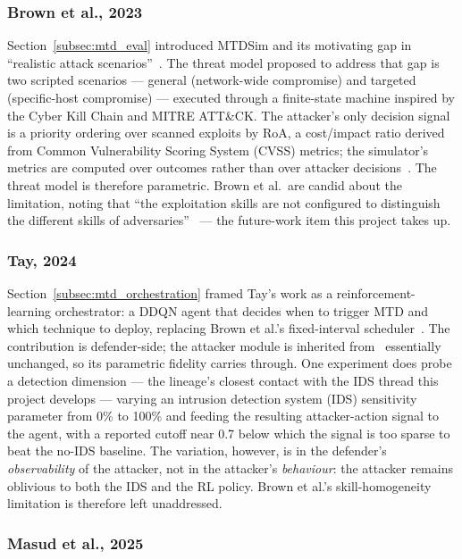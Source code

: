 \subsubsection{Brown et al., 2023}

Section~\ref{subsec:mtd_eval} introduced MTDSim and its motivating gap in ``realistic attack scenarios''~\cite[p.~1]{brown2023}. The threat model proposed to address that gap is two scripted scenarios --- general (network-wide compromise) and targeted (specific-host compromise) --- executed through a finite-state machine inspired by the Cyber Kill Chain and MITRE ATT\&CK. The attacker's only decision signal is a priority ordering over scanned exploits by RoA, a cost/impact ratio derived from Common Vulnerability Scoring System (CVSS) metrics; the simulator's metrics are computed over outcomes rather than over attacker decisions~\cite{brown2023}. The threat model is therefore parametric. Brown et al.\ are candid about the limitation, noting that ``the exploitation skills are not configured to distinguish the different skills of adversaries''~\cite[p.~7]{brown2023} --- the future-work item this project takes up.

\subsubsection{Tay, 2024}

Section~\ref{subsec:mtd_orchestration} framed Tay's work as a reinforcement-learning orchestrator: a DDQN agent that decides when to trigger MTD and which technique to deploy, replacing Brown et al.'s fixed-interval scheduler~\cite{tay2024}. The contribution is defender-side; the attacker module is inherited from~\cite{brown2023} essentially unchanged, so its parametric fidelity carries through. One experiment does probe a detection dimension --- the lineage's closest contact with the IDS thread this project develops --- varying an intrusion detection system (IDS) sensitivity parameter from 0\% to 100\% and feeding the resulting attacker-action signal to the agent, with a reported cutoff near 0.7 below which the signal is too sparse to beat the no-IDS baseline. The variation, however, is in the defender's \emph{observability} of the attacker, not in the attacker's \emph{behaviour}: the attacker remains oblivious to both the IDS and the RL policy. Brown et al.'s skill-homogeneity limitation is therefore left unaddressed.

\subsubsection{Masud et al., 2025}

